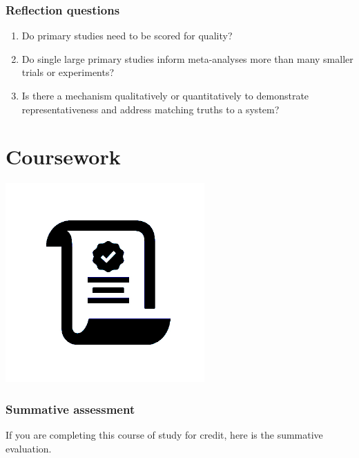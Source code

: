 \documentclass[
]{book}
\providecommand{\tightlist}{%
  \setlength{\itemsep}{0pt}\setlength{\parskip}{0pt}}
\begin{document}
\hypertarget{reflection-questions-3}{%
\subsection*{Reflection questions}\label{reflection-questions-3}}

\begin{enumerate}
\def\labelenumi{\arabic{enumi}.}
\tightlist
\item
  Do primary studies need to be scored for quality?
\item
  Do single large primary studies inform meta-analyses more than many smaller trials or experiments?\\
\item
  Is there a mechanism qualitatively or quantitatively to demonstrate representativeness and address matching truths to a system?
\end{enumerate}

\hypertarget{coursework}{%
\chapter{Coursework}\label{coursework}}

\includegraphics[width=3in,height=\textheight]{./course.jpg}

\hypertarget{summative-assessment}{%
\subsection*{Summative assessment}\label{summative-assessment}}

If you are completing this course of study for credit, here is the summative evaluation.
\end{document}
